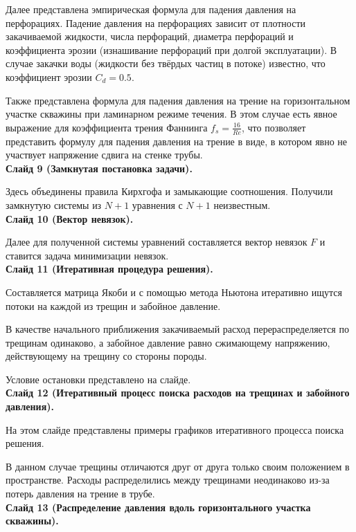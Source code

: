 \documentclass[a4paper, 12pt]{article}
\begin{document}
Далее представлена эмпирическая формула для падения давления на перфорациях.
Падение давления на перфорациях зависит от плотности закачиваемой жидкости, числа перфораций, диаметра перфораций и коэффициента эрозии (изнашивание перфораций при долгой эксплуатации).
В случае закачки воды (жидкости без твёрдых частиц в потоке) известно, что коэффициент эрозии $C_d=0.5$.

Также представлена формула для падения давления на трение на горизонтальном участке скважины при ламинарном режиме течения.
В этом случае есть явное выражение для коэффициента трения Фаннинга $f_s=\frac{16}{Re}$, что позволяет представить формулу для падения давления на трение в виде, в котором явно не участвует напряжение сдвига на стенке трубы.
\\


\textbf{Слайд 9 (Замкнутая постановка задачи).}

Здесь объединены правила Кирхгофа и замыкающие соотношения.
Получили замкнутую системы из $N+1$ уравнения с $N+1$ неизвестным.
\\


\textbf{Слайд 10 (Вектор невязок).}

Далее для полученной системы уравнений составляется вектор невязок $F$ и ставится задача минимизации невязок.
\\


\textbf{Слайд 11 (Итеративная процедура решения).}

Составляется матрица Якоби и с помощью метода Ньютона итеративно ищутся потоки на каждой из трещин и забойное давление.

В качестве начального приближения закачиваемый расход перераспределяется по трещинам одинаково, а забойное давление равно сжимающему напряжению, действующему на трещину со стороны породы.

Условие остановки представлено на слайде.
\\


\textbf{Слайд 12 (Итеративный процесс поиска расходов на трещинах и забойного давления).}

На этом слайде представлены примеры графиков итеративного процесса поиска решения.

В данном случае трещины отличаются друг от друга только своим положением в пространстве.
Расходы распределились между трещинами неодинаково из-за потерь давления на трение в трубе.
\\


\textbf{Слайд 13 (Распределение давления вдоль горизонтального участка скважины).}
\end{document}
